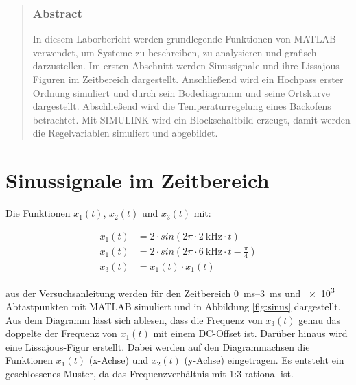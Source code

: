 \documentclass[
    paper=a4,
    fontsize=10pt,
    DIV=12,
    oneside,
]{scrartcl}
\date{\today}
\begin{document}
\maketitle


\begin{abstract}
    \noindent    
    \subsubsection*{Abstract}
        In diesem Laborbericht werden grundlegende Funktionen von MATLAB verwendet, um Systeme zu beschreiben, zu analysieren und grafisch darzustellen. Im ersten Abschnitt werden    Sinussignale und ihre Lissajous-Figuren im Zeitbereich dargestellt. Anschließend wird ein Hochpass erster Ordnung simuliert und durch sein Bodediagramm und seine Ortskurve dargestellt. Abschließend wird die Temperaturregelung eines Backofens betrachtet. Mit SIMULINK wird ein Blockschaltbild erzeugt, damit werden die Regelvariablen simuliert und abgebildet.
\end{abstract}


\section{Sinussignale im Zeitbereich}
    Die Funktionen \(x_1(t)\), \(x_2(t)\) und \(x_3(t)\) mit:

    \begin{align}
        x_1(t) &= 2 \cdot sin(2\pi \cdot \SI{2}{\kilo\hertz} \cdot t)\\
        x_1(t) &= 2 \cdot sin(2\pi \cdot \SI{6}{\kilo\hertz} \cdot t - \frac{\pi}{4})\\
        x_3(t) &= x_1(t) \cdot x_1(t)
    \end{align}

    \noindent
    aus der Versuchsanleitung \cite{versuch1} werden für den Zeitbereich \SIrange{0}{3}{\milli\second} und \num{e3} Abtastpunkten mit MATLAB simuliert und in Abbildung \ref{fig:sinus} dargestellt. Aus dem Diagramm lässt sich ablesen, dass die Frequenz von \(x_3(t)\) genau das doppelte der Frequenz von \(x_1(t)\) mit einem DC-Offset ist.
    Darüber hinaus wird eine Lissajous-Figur erstellt. Dabei werden auf den Diagrammachsen die Funktionen \(x_1(t)\) (x-Achse) und \(x_2(t)\) (y-Achse) eingetragen. Es entsteht ein geschlossenes Muster, da das Frequenzverhältnis mit 1:3 rational ist. 
\end{document}
